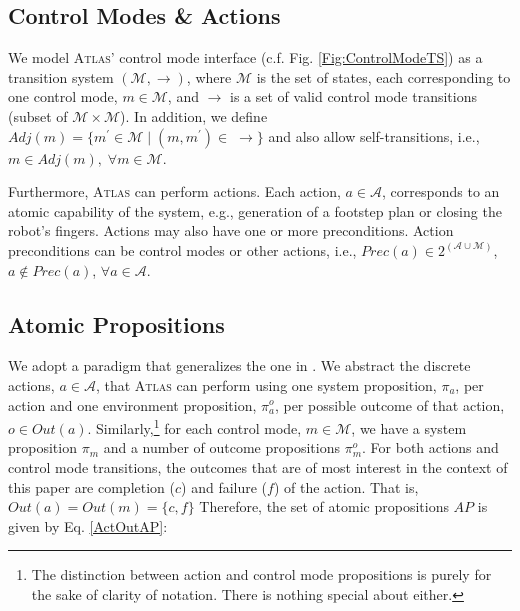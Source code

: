 
\subsection{Control Modes \& Actions}

We model \textsc{Atlas}' control mode interface (c.f. Fig. \ref{Fig:ControlModeTS}) as a transition system $(\mathcal{M}, \boldsymbol\rightarrow)$, where $\mathcal{M}$ is the set of states, each corresponding to one control mode, $m \in \mathcal{M}$, and $\boldsymbol\rightarrow$ is a set of valid control mode transitions (subset of $\mathcal{M} \times \mathcal{M}$).
In addition, we define $Adj(m) = \{ m^\prime \in \mathcal{M} \; | \; (m, m^\prime) \in \; \boldsymbol\rightarrow \}$ and also allow self-transitions, i.e., $m \in Adj(m), \; \forall m \in \mathcal{M}$.

Furthermore, \textsc{Atlas} can perform actions. Each action, $a \in \mathcal{A}$, corresponds to an atomic capability of the system, e.g., generation of a footstep plan or closing the robot's fingers.
Actions may also have one or more preconditions.
Action preconditions can be control modes or other actions, i.e., $Prec(a) \in 2^{(\mathcal{A} \cup \mathcal{M})}$, $a \not \in Prec(a)$, $\forall a \in \mathcal{A}$.

\subsection{Atomic Propositions}


We adopt a paradigm that generalizes the one in \cite{Vasu2013ICRA}.
We abstract the discrete actions, $a \in \mathcal{A}$, that \textsc{Atlas} can perform using one system proposition, $\pi_a$, per action and one environment proposition, $\pi_a^o$, per possible outcome of that action, $o \in Out(a)$.
Similarly,\footnote{The distinction between action and control mode propositions is purely for the sake of clarity of notation. There is nothing special about either.}
for each control mode, $m \in \mathcal{M}$, we have a system proposition $\pi_m$ and a number of outcome propositions $\pi_m^o$.
For both actions and control mode transitions, the outcomes that are of most interest in the context of this paper are completion ($c$) and failure ($f$) of the action. That is, $Out(a) = Out(m) = \{ c, f \}$
Therefore, the set of atomic propositions $AP$ is given by Eq. \eqref{ActOutAP}:

